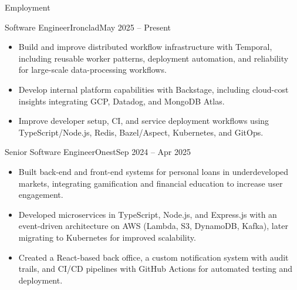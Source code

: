 \documentclass[calibri]{../mcdowell-cv/mcdowellcv}
\begin{document}
	\makeheader
	
	\begin{cvsection}{Employment}
		\begin{cvsubsection}{Software Engineer}{Ironclad}{May 2025 -- Present}
			\begin{itemize}
				\item Build and improve distributed workflow infrastructure with Temporal, including reusable worker patterns, deployment automation, and reliability for large-scale data-processing workflows.
			\end{itemize}
			\begin{itemize}
				\item Develop internal platform capabilities with Backstage, including cloud-cost insights integrating GCP, Datadog, and MongoDB Atlas.
			\end{itemize}
			\begin{itemize}
				\item Improve developer setup, CI, and service deployment workflows using TypeScript/Node.js, Redis, Bazel/Aspect, Kubernetes, and GitOps.
			\end{itemize}
		\end{cvsubsection}

		\begin{cvsubsection}{Senior Software Engineer}{Onest}{Sep 2024 -- Apr 2025}
			\begin{itemize}
				\item Built back-end and front-end systems for personal loans in underdeveloped markets, integrating gamification and financial education to increase user engagement.
				\item Developed microservices in TypeScript, Node.js, and Express.js with an event-driven architecture on AWS (Lambda, S3, DynamoDB, Kafka), later migrating to Kubernetes for improved scalability.
				\item Created a React-based back office, a custom notification system with audit trails, and CI/CD pipelines with GitHub Actions for automated testing and deployment.
			\end{itemize}
		\end{cvsubsection}


\end{cvsection}
\end{document}
